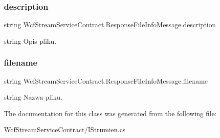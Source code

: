 \subsubsection{\texorpdfstring{description}{description}}
{\footnotesize\ttfamily string Wcf\+Stream\+Service\+Contract.\+Response\+File\+Info\+Message.\+description}



string Opis pliku. 

\mbox{\label{class_wcf_stream_service_contract_1_1_response_file_info_message_aaf27aebcd1b3b4ed2491f9269d82d7b4}} 
\subsubsection{\texorpdfstring{filename}{filename}}
{\footnotesize\ttfamily string Wcf\+Stream\+Service\+Contract.\+Response\+File\+Info\+Message.\+filename}



string Nazwa pliku. 



The documentation for this class was generated from the following file\+:\begin{DoxyCompactItemize}
\item 
Wcf\+Stream\+Service\+Contract/I\+Strumien.\+cs\end{DoxyCompactItemize}
